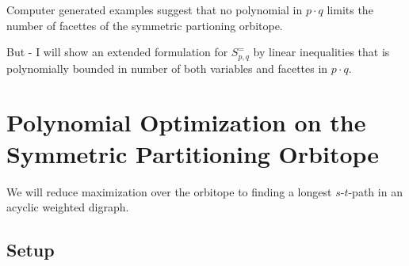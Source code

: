 \documentclass[a4paper]{amsart}
\theoremstyle{lemma}
\theoremstyle{definition}
\theoremstyle{remark}
\begin{document}






Computer generated examples suggest that no polynomial in \(p \cdot
q\) limits the number of facettes of the symmetric partioning
orbitope.

But - I will show an extended formulation for \(S^=_{p, q}\) by linear
inequalities that is polynomially bounded in number of both variables
and facettes in \(p \cdot q\).






\section{Polynomial Optimization on the  Symmetric Partitioning
  Orbitope}
\label{fluss}
We will reduce maximization over the orbitope to finding a longest
\(s\)-\(t\)-path in an acyclic weighted digraph.

\subsection{Setup}
\end{document}
